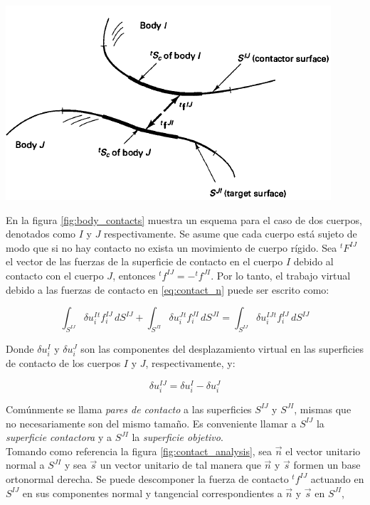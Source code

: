 \begin{center}
\includegraphics[scale=0.9]{src/ch2/body_contacts.png}
\label{fig:body_contacts}
\end{center}

En la figura \ref{fig:body_contacts} muestra un esquema para el caso de dos cuerpos, 
denotados como $I$ y $J$ respectivamente. Se asume que cada cuerpo está sujeto de
modo que si no hay contacto no exista un movimiento de cuerpo rígido. Sea $^tF^{IJ}$ 
el vector de las fuerzas de la superficie de contacto en el cuerpo $I$ debido 
al contacto con el cuerpo $J$, entonces $^tf^{IJ} = -^tf^{JI}$. Por lo tanto, 
el trabajo virtual debido a las fuerzas de contacto en \ref{eq:contact_n} puede 
ser escrito como:

\begin{equation}
\int_{S^{IJ}} \delta u_i^I ^tf_i^{IJ} \, dS^{IJ} + 
\int_{S^{JI}} \delta u_i^J ^tf_i^{JI} \, dS^{JI} = 
\int_{S^{IJ}} \delta u_i^{IJ} ^tf_i^{IJ} \, dS^{IJ}
\end{equation}

Donde $\delta u_i^I$ y $\delta u_i^J$ son las componentes del desplazamiento virtual en 
las superficies de contacto de los cuerpos $I$ y $J$, respectivamente, y:

\begin{equation}
\delta u_i^{IJ} = \delta u_i^I - \delta u_i^J
\end{equation}

Comúnmente se llama \textit{pares de contacto} a las superficies $S^{IJ}$ y $S^{JI}$, mismas 
que no necesariamente son del mismo tamaño. Es conveniente llamar a $S^{IJ}$ la 
\textit{superficie contactora} y a $S^{JI}$ la \textit{superficie objetivo}.\\

Tomando como referencia la figura \ref{fig:contact_analysis}, sea $\vec{n}$ el vector unitario 
normal a $S^{JI}$ y sea $\vec{s}$ un vector unitario de tal manera que $\vec{n}$ y $\vec{s}$ formen un base 
ortonormal derecha. Se puede descomponer la fuerza de contacto $^tf^{IJ}$ actuando en $S^{IJ}$ en 
sus componentes normal y tangencial correspondientes a $\vec{n}$ y $\vec{s}$ en $S^{JI}$,

